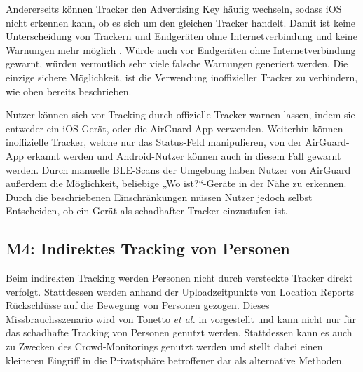 Andererseits können Tracker den Advertising Key häufig wechseln, sodass iOS nicht erkennen kann, ob es sich um den gleichen Tracker handelt.
Damit ist keine Unterscheidung von Trackern und Endgeräten ohne Internetverbindung und keine Warnungen mehr möglich \cite{Mayberry_Tracking}.
Würde auch vor Endgeräten ohne Internetverbindung gewarnt, würden vermutlich sehr viele falsche Warnungen generiert werden.
Die einzige sichere Möglichkeit, ist die Verwendung inoffizieller Tracker zu verhindern, wie oben bereits beschrieben.


Nutzer können sich vor Tracking durch offizielle Tracker warnen lassen, indem sie entweder ein iOS-Gerät, oder die AirGuard-App verwenden.
Weiterhin können inoffizielle Tracker, welche nur das Status-Feld manipulieren, von der AirGuard-App erkannt werden und Android-Nutzer können auch in diesem Fall gewarnt werden.
Durch manuelle \ac{BLE}-Scans der Umgebung haben Nutzer von AirGuard außerdem die Möglichkeit, beliebige „Wo ist?“-Geräte in der Nähe zu erkennen.
Durch die beschriebenen Einschränkungen müssen Nutzer jedoch selbst Entscheiden, ob ein Gerät als schadhafter Tracker einzustufen ist.



\subsection[M4]{M4: Indirektes Tracking von Personen}
\label{missbrauch:4}
Beim indirekten Tracking werden Personen nicht durch versteckte Tracker direkt verfolgt.
Stattdessen werden anhand der Uploadzeitpunkte von Location Reports Rückschlüsse auf die Bewegung von Personen gezogen.
Dieses Missbrauchsszenario wird von Tonetto \textit{et al.} in \cite{Tonetto_FindMy} vorgestellt und kann nicht nur für das schadhafte Tracking von Personen genutzt werden.
Stattdessen kann es auch zu Zwecken des Crowd-Monitorings genutzt werden und stellt dabei einen kleineren Eingriff in die Privatsphäre betroffener dar als alternative Methoden. 

